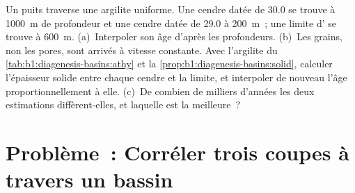 \begin{exercise}[$\star\star\star$]\label{exo:b1:stratigraphic-scale:12}
Un puits traverse une argilite uniforme. Une cendre datée de \qty{30.0}{\Ma} se trouve à
\qty{1000}{m} de profondeur et une cendre datée de \qty{29.0}{\Ma} à \qty{200}{m}~; une limite
d' se trouve à \qty{600}{m}. (a)~Interpoler son âge d'après les profondeurs. (b)~Les
grains, non les pores, sont arrivés à vitesse constante. Avec l'argilite du
\cref{tab:b1:diagenesis-basins:athy} et la
\cref{prop:b1:diagenesis-basins:solid}, calculer l'épaisseur solide entre chaque
cendre et la limite, et interpoler de nouveau l'âge proportionnellement à elle.
(c)~De combien de milliers d'années les deux estimations diffèrent-elles, et laquelle est la
meilleure~?
\end{exercise}

\section{Problème~: Corréler trois coupes à travers un bassin}

